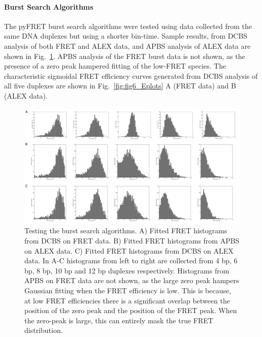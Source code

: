\paragraph{Burst Search Algorithms}
The pyFRET burst search algorithms were tested using data collected from the same DNA duplexes but using a shorter bin-time. Sample results, from DCBS analysis of both FRET and ALEX data, and APBS analysis of ALEX data are shown in Fig.~\ref{fig:burst_search}. APBS analysis of the FRET burst data is not shown, as the presence of a zero peak hampered fitting of the low-FRET species. The characteristic sigmoidal FRET efficiency curves generated from DCBS analysis of all five duplexes are shown in Fig.~\ref{fig:fig6_Eplots} A (FRET data) and B (ALEX data).

\begin{landscape}
\begin{figure}[!ht]
   \begin{center}
      \includegraphics*[clip=true, width=9in]{pyFRET/burst_search.pdf}
      \caption{Testing the burst search algorithms. A) Fitted FRET histograms from DCBS on FRET data. B) Fitted FRET histograms from APBS on ALEX data. C) Fitted FRET histograms from DCBS on ALEX data. In A-C histograms from left to right are collected from 4 bp, 6 bp, 8 bp, 10 bp and 12 bp duplexes respectively. Histograms from APBS on FRET data are not shown, as the large zero peak hampers Gaussian fitting when the FRET efficiency is low. This is because, at low FRET efficiencies there is a significant overlap between the position of the zero peak and the position of the FRET peak. When the zero-peak is large, this can entirely mask the true FRET distribution.}
      \label{fig:burst_search}
   \end{center}
\end{figure}
\end{landscape}

